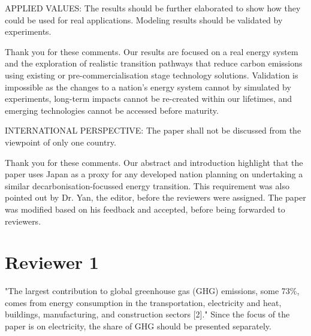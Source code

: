 \documentclass[answers,11pt]{exam}
\begin{document}
\begin{questions}
\begin{solution}
        \end{solution}

          \question  

APPLIED VALUES: The results should be further elaborated to show how they could be used for real applications. Modeling results should be validated by experiments.
 \begin{solution}
                Thank you for these comments. Our results are focused on a real energy system and the exploration of realistic transition pathways that reduce carbon emissions using existing or pre-commercialisation stage technology solutions. Validation is impossible as the changes to a nation's energy system cannot by simulated by experiments, long-term impacts cannot be re-created within our lifetimes, and emerging technologies cannot be accessed before maturity.
                
        \end{solution}

    
       \question  

INTERNATIONAL PERSPECTIVE: The paper shall not be discussed from the viewpoint of only one country.
 \begin{solution}
                Thank you for these comments. Our abstract and introduction highlight that the paper uses Japan as a proxy for any developed nation planning on undertaking a similar decarbonisation-focussed energy transition. This requirement was also pointed out by Dr. Yan, the editor, before the reviewers were assigned. The paper was modified based on his feedback and accepted, before being forwarded to reviewers.
                
        \end{solution}

    
    
        \section*{Reviewer 1}

        
         \question "The largest contribution to global greenhouse gas (GHG) emissions, some 73\%, comes from energy consumption in the transportation, electricity and heat, buildings, manufacturing, and construction sectors [2]."
Since the focus of the paper is on electricity, the share of GHG should be presented separately.
        

\end{questions}
\end{document}
